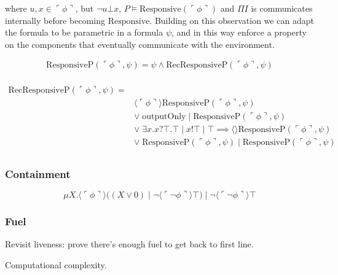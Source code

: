 \documentclass{llncs}
\newcommand{\lpquote}{\ulcorner}
\newcommand{\rpquote}{\urcorner}
\newcommand{\quotep}[1]{\lpquote #1 \rpquote}
\begin{document}
where $u, x \in \quotep{\phi}$, but $\neg u \bot x$, $P \models \mbox{Responsive}(\quotep{\phi})$ and $\Pi I$ is communicates internally before becoming
$\mbox{Responsive}$. Building on this observation we can adapt the
formula to be parametric in a formula $\psi$, and in this way enforce
a property on the components that eventually communicate with the environment.

\[\begin{array}{rl}
\mbox{ResponsiveP}( \quotep{\phi}, \psi ) = \psi \land \mbox{RecResponsiveP}( \quotep{\phi}, \psi ) \\
\end{array}\]

\[\begin{array}{rl}
\mbox{RecResponsiveP}( \quotep{\phi}, \psi ) = & \\
  & \langle \quotep{\phi} \rangle \mbox{ResponsiveP}( \quotep{\phi}, \psi ) \\
  & \lor\; \mbox{outputOnly}\; | \;\mbox{ResponsiveP}( \quotep{\phi}, \psi ) \\
  & \lor\; \exists x. x?\top.\top \;|\; x!\top \;|\; \top \implies \langle\rangle \mbox{ResponsiveP}( \quotep{\phi}, \psi )\\
  & \lor\; \mbox{ResponsiveP}( \quotep{\phi}, \psi ) \; | \;\mbox{ResponsiveP}( \quotep{\phi}, \psi ) \\
\end{array}\]

\subsubsection{Containment}
\[ \mu X. \langle \quotep{\phi} \rangle ((X \lor 0)\;|\;\neg\langle\quotep{\neg \phi}\rangle\top)\;|\;\neg\langle\quotep{\neg \phi}\rangle\top \]
\subsubsection{Fuel}
Revisit liveness: prove there's enough fuel to get back to first line.

Computational complexity.



\end{document}
